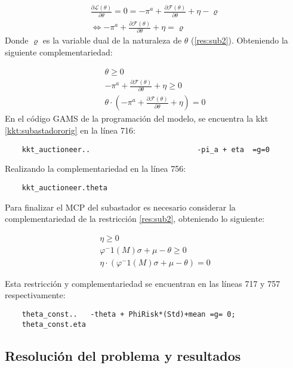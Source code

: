 \footnotesize{
\begin{align}
    \frac{\partial \mathcal{L}(\theta) }{\partial \theta} = 0 =  -\pi^a + \frac{\partial\mathcal{F}(\theta)}{\partial \theta} + \eta - \varrho \\
    \Leftrightarrow -\pi^a + \frac{\partial\mathcal{F}(\theta)}{\partial \theta} + \eta = \varrho \label{kkt:subastadororiginal}
\end{align}
}
Donde $\varrho$ es la variable dual de la naturaleza de $\theta$ (\ref{res:sub2}). Obteniendo la siguiente complementariedad:

\footnotesize{
\begin{align}
    \theta \geq 0 \\
    -\pi^a + \frac{\partial\mathcal{F}(\theta)}{\partial \theta} + \eta \geq 0\\
    \theta \cdot (-\pi^a + \frac{\partial\mathcal{F}(\theta)}{\partial \theta} + \eta)=0
\end{align}
}
En el código GAMS de la programación del modelo, se encuentra la kkt \ref{kkt:subastadororig} en la línea 716:

\begin{verbatim}
    kkt_auctioneer..                         -pi_a + eta  =g=0
\end{verbatim}

Realizando la complementariedad en la línea 756:

\begin{verbatim}
    kkt_auctioneer.theta
\end{verbatim}

Para finalizar el MCP del subastador es necesario considerar la complementariedad de la restricción \ref{res:sub2}, obteniendo lo siguiente: 

\footnotesize{
\begin{align}
 \eta \geq 0 \\
 \varphi^-1(M)\sigma+\mu-\theta \geq 0 \\
 \eta \cdot (\varphi^-1(M)\sigma+\mu-\theta)=0
\end{align}}

Esta restricción y complementariedad se encuentran en las líneas 717 y 757 respectivamente:

\begin{verbatim}
    theta_const..   -theta + PhiRisk*(Std)+mean =g= 0;
    theta_const.eta
\end{verbatim}

\subsection{Resolución del problema y resultados}

